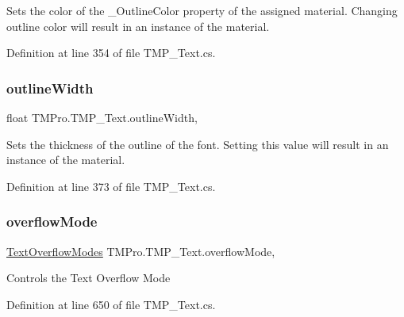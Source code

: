 Sets the color of the \+\_\+\+Outline\+Color property of the assigned material. Changing outline color will result in an instance of the material. 



Definition at line 354 of file T\+M\+P\+\_\+\+Text.\+cs.

\mbox{\label{class_t_m_pro_1_1_t_m_p___text_af06ac98d6059319b0372b8f993759653}} 
\subsubsection{\texorpdfstring{outlineWidth}{outlineWidth}}
{\footnotesize\ttfamily float T\+M\+Pro.\+T\+M\+P\+\_\+\+Text.\+outline\+Width\hspace{0.3cm}{\ttfamily [get]}, {\ttfamily [set]}}



Sets the thickness of the outline of the font. Setting this value will result in an instance of the material. 



Definition at line 373 of file T\+M\+P\+\_\+\+Text.\+cs.

\mbox{\label{class_t_m_pro_1_1_t_m_p___text_acd1d576f27eb0362b41e03c5c0ee53e5}} 
\subsubsection{\texorpdfstring{overflowMode}{overflowMode}}
{\footnotesize\ttfamily \mbox{\hyperlink{namespace_t_m_pro_a7234b7b8868aa9f0174e7db46e272a17}{Text\+Overflow\+Modes}} T\+M\+Pro.\+T\+M\+P\+\_\+\+Text.\+overflow\+Mode\hspace{0.3cm}{\ttfamily [get]}, {\ttfamily [set]}}





Controls the Text Overflow Mode 

Definition at line 650 of file T\+M\+P\+\_\+\+Text.\+cs.

\mbox{\label{class_t_m_pro_1_1_t_m_p___text_a295f3c60b2fbbbe6be559705ef480287}} 

